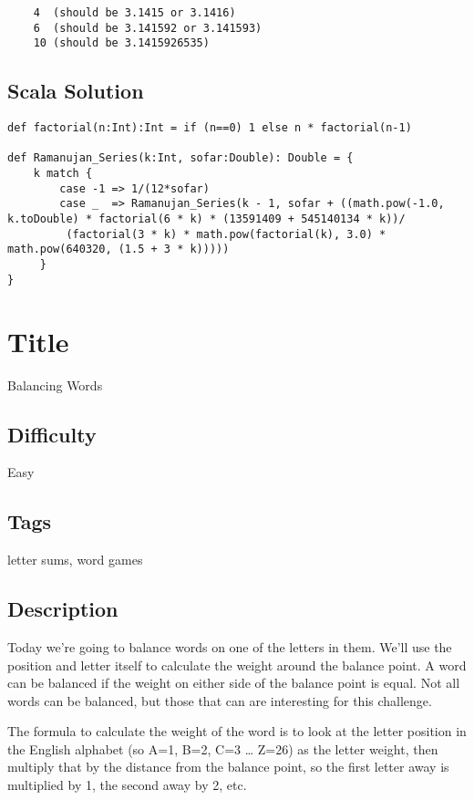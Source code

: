 \begin{verbatim}
    4  (should be 3.1415 or 3.1416)
    6  (should be 3.141592 or 3.141593) 
    10 (should be 3.1415926535)
\end{verbatim}

\subsection{Scala Solution}\label{scala-solution}

\begin{verbatim}
def factorial(n:Int):Int = if (n==0) 1 else n * factorial(n-1)

def Ramanujan_Series(k:Int, sofar:Double): Double = {
    k match {
        case -1 => 1/(12*sofar)
        case _  => Ramanujan_Series(k - 1, sofar + ((math.pow(-1.0, k.toDouble) * factorial(6 * k) * (13591409 + 545140134 * k))/
         (factorial(3 * k) * math.pow(factorial(k), 3.0) * math.pow(640320, (1.5 + 3 * k)))))
     }
}  
\end{verbatim}

\section{Title}\label{title-1}

Balancing Words

\subsection{Difficulty}\label{difficulty-1}

Easy

\subsection{Tags}\label{tags-1}

letter sums, word games

\subsection{Description}\label{description-1}

Today we're going to balance words on one of the letters in them. We'll
use the position and letter itself to calculate the weight around the
balance point. A word can be balanced if the weight on either side of
the balance point is equal. Not all words can be balanced, but those
that can are interesting for this challenge.

The formula to calculate the weight of the word is to look at the letter
position in the English alphabet (so A=1, B=2, C=3 \ldots{} Z=26) as the
letter weight, then multiply that by the distance from the balance
point, so the first letter away is multiplied by 1, the second away by
2, etc.

